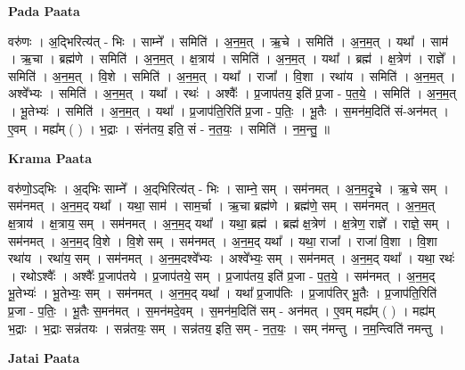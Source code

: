 \documentclass[17pt]{extarticle}
\begin{document}
\textbf{Pada Paata} \newline

वरु॑णः । अ॒द्भिरित्य॑त् - भिः । साम्ने᳚ । समिति॑ । अ॒न॒म॒त् । ऋ॒चे । समिति॑ । अ॒न॒म॒त् । यथा᳚ । साम॑ । ऋ॒चा । ब्रह्म॑णे । समिति॑ । अ॒न॒म॒त् । क्ष॒त्राय॑ । समिति॑ । अ॒न॒म॒त् । यथा᳚ । ब्रह्म॑ । क्ष॒त्रेण॑ । राज्ञे᳚ । समिति॑ । अ॒न॒म॒त् । वि॒शे । समिति॑ । अ॒न॒म॒त् । यथा᳚ । राजा᳚ । वि॒शा । रथा॑य । समिति॑ । अ॒न॒म॒त् । अश्वे᳚भ्यः । समिति॑ । अ॒न॒म॒त् । यथा᳚ । रथः॑ । अश्वैः᳚ । प्र॒जाप॑तय॒ इति॑ प्र॒जा - प॒त॒ये॒ । समिति॑ । अ॒न॒म॒त् । भू॒तेभ्यः॑ । समिति॑ । अ॒न॒म॒त् । यथा᳚ । प्र॒जाप॑ति॒रिति॑ प्र॒जा - प॒तिः॒ । भू॒तैः । स॒मन॑म॒दिति॑ सं-अन॑मत् । ए॒वम् । मह्य᳚म् ( ) । भ॒द्राः । संन॑तय॒ इति॒ सं - न॒त॒यः॒ । समिति॑ । न॒म॒न्तु॒ ॥  \newline


\textbf{Krama Paata} \newline

वरु॑णो॒ऽद्‌भिः । अ॒द्‌भिः साम्ने᳚ । अ॒द्‌भिरित्य॑त् - भिः । साम्ने॒ सम् । सम॑नमत् । अ॒न॒म॒दृ॒चे । ऋ॒चे सम् । सम॑नमत् । अ॒न॒म॒द् यथा᳚ । यथा॒ साम॑ । साम॒र्चा । ऋ॒चा ब्रह्म॑णे । ब्रह्म॑णे॒ सम् । सम॑नमत् । अ॒न॒म॒त् क्ष॒त्राय॑ । क्ष॒त्राय॒ सम् । सम॑नमत् । अ॒न॒म॒द् यथा᳚ । यथा॒ ब्रह्म॑ । ब्रह्म॑ क्ष॒त्रेण॑ । क्ष॒त्रेण॒ राज्ञे᳚ । राज्ञे॒ सम् । सम॑नमत् । अ॒न॒म॒द् वि॒शे । वि॒शे सम् । सम॑नमत् । अ॒न॒म॒द् यथा᳚ । यथा॒ राजा᳚ । राजा॑ वि॒शा । वि॒शा रथा॑य । रथा॑य॒ सम् । सम॑नमत् । अ॒न॒म॒दश्वे᳚भ्यः । अश्वे᳚भ्यः॒ सम् । सम॑नमत् । 
अ॒न॒म॒द् यथा᳚ । यथा॒ रथः॑ । रथोऽश्वैः᳚ । अश्वैः᳚ प्र॒जाप॑तये । प्र॒जाप॑तये॒ सम् । प्र॒जाप॑तय॒ इति॑ प्र॒जा - प॒त॒ये॒ । सम॑नमत् । अ॒न॒म॒द् भू॒तेभ्यः॑ । भू॒तेभ्यः॒ सम् । सम॑नमत् । अ॒न॒म॒द् यथा᳚ । यथा᳚ प्र॒जाप॑तिः । प्र॒जाप॑तिर् भू॒तैः । प्र॒जाप॑ति॒रिति॑ प्र॒जा - प॒तिः॒ । भू॒तैः स॒मन॑मत् । स॒मन॑मदे॒वम् । स॒मन॑म॒दिति॑ सम् - अन॑मत् । ए॒वम् मह्य᳚म् ( ) । मह्य॑म् भ॒द्राः । भ॒द्राः सन्न॑तयः । सन्न॑तयः॒ सम् । सन्न॑तय॒ इति॒ सम् - न॒त॒यः॒ । सम् न॑मन्तु । न॒म॒न्त्विति॑ नमन्तु । \newline

\textbf{Jatai Paata} \newline
\end{document}
